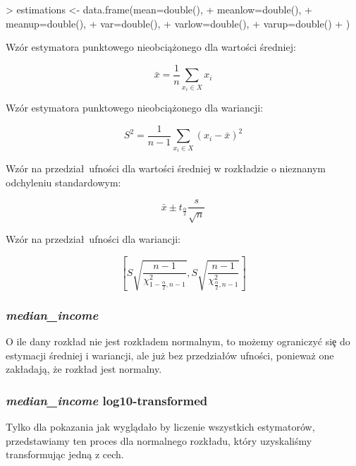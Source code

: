 \documentclass{article}
\begin{document}
\begin{Schunk}
\begin{Sinput}
> estimations <- data.frame(mean=double(),
+                           meanlow=double(),
+                           meanup=double(),
+                           var=double(),
+                           varlow=double(),
+                           varup=double()
+                           )
\end{Sinput}
\end{Schunk}

\noindent
\quad Wzór estymatora punktowego nieobciążonego dla wartości średniej:

\[ \bar{x} = \frac{1}{n}\sum_{x_i \in X} x_i \]

\noindent
\quad Wzór estymatora punktowego nieobciążonego dla wariancji:

\[ S^2 = \frac{1}{n-1}\sum_{x_i \in X} (x_i - \bar{x})^2 \]

\noindent
\quad Wzór na przedzia\l\ ufności dla wartości średniej w rozk\l adzie o nieznanym odchyleniu standardowym:

\[ \bar{x} \pm t_{\frac{\alpha}{2}}\frac{s}{\sqrt{n}}\]

\noindent
\quad Wzór na przedzia\l\ ufności dla wariancji:

\[ \left[S\sqrt{\frac{n-1}{\chi^2_{1-\frac{\alpha}{2}, n-1}}}, S\sqrt{\frac{n-1}{\chi^2_{\frac{\alpha}{2}, n-1}}}\right] \]

\subsubsection{\textit{median\_income}}
\quad O ile dany rozk\l ad nie jest rozk\l adem normalnym, to możemy ograniczy\'c si\c e do estymacji średniej i wariancji, ale już bez przedzia\l ów ufności, ponieważ one zak\l adają, że rozk\l ad jest normalny.

\begin{Schunk}
\end{Schunk}

\subsubsection{\textit{median\_income} log10-transformed}
\quad Tylko dla pokazania jak wygląda\l o by liczenie wszystkich estymatorów, przedstawiamy ten proces dla normalnego rozk\l adu, który uzyskaliśmy transformując jedną z cech.
\end{document}

